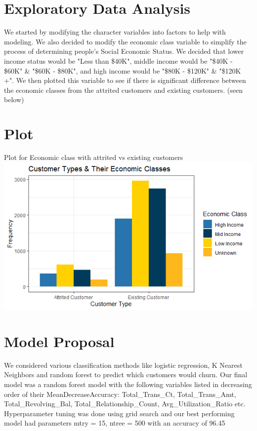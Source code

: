 \documentclass[a0paper,fleqn]{betterposter}
\begin{document}
{\section{Exploratory Data Analysis}
We started by modifying the character variables into factors to help with modeling. We also  decided to modify the economic class variable to simplify the process of determining people's Social Economic Status. We decided that lower income status would be "Less than \$40K", middle income would be "\$40K - \$60K" & "\$60K - \$80K", and high income would be "\$80K - \$120K" & "\$120K +". We then plotted this variable to see if there is significant difference between the economic classes from the attrited customers and existing customers. (seen below)

\section{Plot}
Plot for Economic class with attrited vs existing customers\\

\includegraphics[width=\textwidth]{img/Rplot.png}\\ 


}{
\section{Model Proposal}
We considered various classification methods like logistic regression, K Nearest Neighbors and random forest to predict which customers would churn. Our final model was a random forest model with the following variables listed in decreasing order of their MeanDecreaseAccuracy: Total\_Trans\_Ct, Total\_Trans\_Amt, Total\_Revolving\_Bal, Total\_Relationship\_Count, Avg\_Utilization\_Ratio etc. Hyperparameter tuning was done using grid search and our best performing model had parameters mtry = 15, ntree = 500 with an accuracy of 96.45%


}
\end{document}
